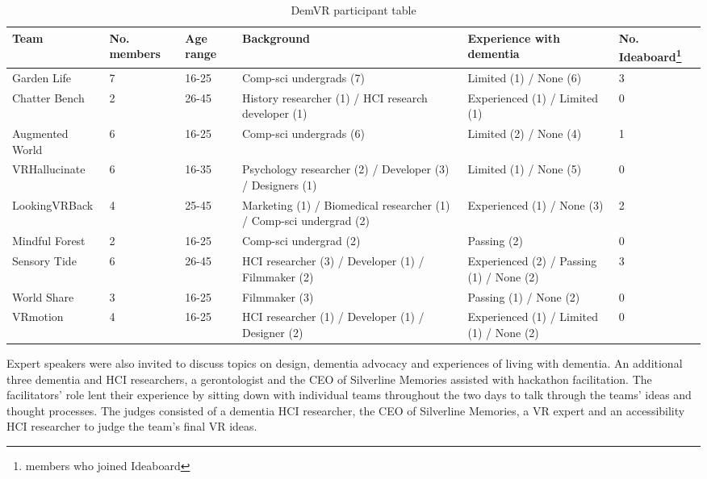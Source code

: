 \begin{table}[htp]
\renewcommand{\arraystretch}{1.4}
\begin{tabularx}{\textwidth}{@{} YYYYYY @{}}
\hline
\textbf{Team} & \textbf{No. members} & \textbf{Age range} & \textbf{Background} & \textbf{Experience with dementia} & \textbf{No. Ideaboard\footnote{members who joined Ideaboard}} \\ \hline 
Garden Life & 7 & 16-25 & Comp-sci undergrads (7) & Limited (1) / None (6) & 3 \\ \hline
Chatter Bench & 2 & 26-45 & History researcher (1) / HCI research developer   (1) & Experienced (1) / Limited (1) & 0 \\ \hline
Augmented World & 6 & 16-25 & Comp-sci undergrads (6) & Limited (2) / None (4) & 1 \\ \hline
VRHallucinate & 6 & 16-35 & Psychology researcher (2) / Developer (3) /   Designers (1) & Limited (1) / None (5) & 0 \\ \hline
LookingVRBack & 4 & 25-45 & Marketing (1) / Biomedical researcher (1) /   Comp-sci undergrad (2) & Experienced (1) / None (3) & 2 \\ \hline
Mindful Forest & 2 & 16-25 & Comp-sci undergrad (2) & Passing (2) & 0 \\ \hline
Sensory Tide & 6 & 26-45 & HCI researcher (3) / Developer (1) / Filmmaker   (2) & Experienced (2) / Passing (1) / None (2) & 3 \\ \hline
World Share & 3 & 16-25 & Filmmaker (3) & Passing (1) / None (2) & 0 \\ \hline
VRmotion & 4 & 16-25 & HCI researcher (1) / Developer (1) / Designer   (2) & Experienced (1) / Limited (1) / None (2) & 0 \\ \hline
\end{tabularx}
\caption{DemVR participant table}
\label{table:DemVRDemographic}
\end{table}

Expert speakers were also invited to discuss topics on design, dementia advocacy and experiences of living with dementia. An additional three dementia and HCI researchers, a gerontologist and the CEO of Silverline Memories assisted with hackathon facilitation. The facilitators' role lent their experience by sitting down with individual teams throughout the two days to talk through the teams' ideas and thought processes. The judges consisted of a dementia HCI researcher, the CEO of Silverline Memories, a VR expert and an accessibility HCI researcher to judge the team's final VR ideas.

